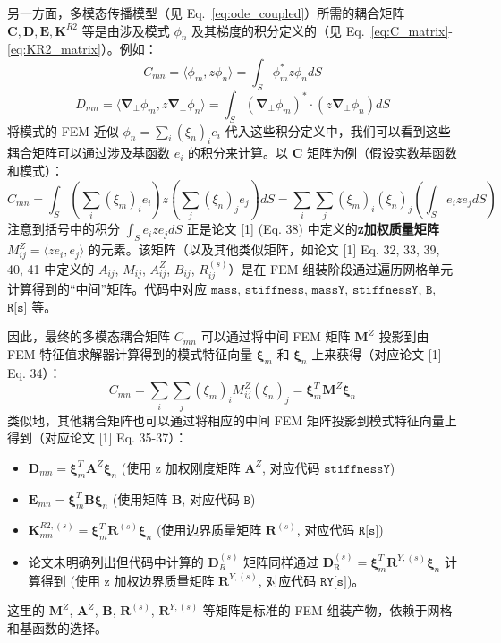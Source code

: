 \documentclass{ctexart}
\begin{document}
另一方面，多模态传播模型（见 Eq.~\eqref{eq:ode_coupled}）所需的耦合矩阵 $\mathbf{C}, \mathbf{D}, \mathbf{E}, \mathbf{K}^{R2}$ 等是由涉及模式 $\phi_n$ 及其梯度的积分定义的（见 Eq.~\eqref{eq:C_matrix}-\eqref{eq:KR2_matrix}）。例如：
\[
C_{mn} = \langle \phi_m, z \phi_n \rangle = \int_S \phi_m^* z \phi_n dS
\]
\[
D_{mn} = \langle \boldsymbol{\nabla}_\perp \phi_m, z \boldsymbol{\nabla}_\perp \phi_n \rangle = \int_S (\boldsymbol{\nabla}_\perp \phi_m)^* \cdot (z \boldsymbol{\nabla}_\perp \phi_n) dS
\]
将模式的 FEM 近似 $\phi_n = \sum_i (\xi_n)_i e_i$ 代入这些积分定义中，我们可以看到这些耦合矩阵可以通过涉及基函数 $e_i$ 的积分来计算。以 $\mathbf{C}$ 矩阵为例（假设实数基函数和模式）：
\[
C_{mn} = \int_S \left( \sum_i (\xi_m)_i e_i \right) z \left( \sum_j (\xi_n)_j e_j \right) dS = \sum_i \sum_j (\xi_m)_i (\xi_n)_j \left( \int_S e_i z e_j dS \right)
\]
注意到括号中的积分 $\int_S e_i z e_j dS$ 正是论文 [1] (Eq. 38) 中定义的\textbf{z加权质量矩阵} $M^Z_{ij} = \langle z e_i, e_j \rangle$ 的元素。该矩阵（以及其他类似矩阵，如论文 [1] Eq. 32, 33, 39, 40, 41 中定义的 $A_{ij}$, $M_{ij}$, $A^Z_{ij}$, $B_{ij}$, $R^{(s)}_{ij}$）是在 FEM 组装阶段通过遍历网格单元计算得到的``中间''矩阵。代码中对应 $\texttt{mass}$, $\texttt{stiffness}$, $\texttt{massY}$, $\texttt{stiffnessY}$, $\texttt{B}$, $\texttt{R[s]}$ 等。

因此，最终的多模态耦合矩阵 $C_{mn}$ 可以通过将中间 FEM 矩阵 $\mathbf{M}^Z$ 投影到由 FEM 特征值求解器计算得到的模式特征向量 $\boldsymbol{\xi}_m$ 和 $\boldsymbol{\xi}_n$ 上来获得（对应论文 [1] Eq. 34）：
\[
C_{mn} = \sum_i \sum_j (\xi_m)_i M^Z_{ij} (\xi_n)_j = \boldsymbol{\xi}_m^T \mathbf{M}^Z \boldsymbol{\xi}_n
\]
类似地，其他耦合矩阵也可以通过将相应的中间 FEM 矩阵投影到模式特征向量上得到（对应论文 [1] Eq. 35-37）：
\begin{itemize}
    \item $\mathbf{D}_{mn} = \boldsymbol{\xi}_m^T \mathbf{A}^Z \boldsymbol{\xi}_n$ (使用 z 加权刚度矩阵 $\mathbf{A}^Z$, 对应代码 $\texttt{stiffnessY}$)
    \item $\mathbf{E}_{mn} = \boldsymbol{\xi}_m^T \mathbf{B} \boldsymbol{\xi}_n$ (使用矩阵 $\mathbf{B}$, 对应代码 $\texttt{B}$)
    \item $\mathbf{K}^{R2, (s)}_{mn} = \boldsymbol{\xi}_m^T \mathbf{R}^{(s)} \boldsymbol{\xi}_n$ (使用边界质量矩阵 $\mathbf{R}^{(s)}$, 对应代码 $\texttt{R[s]}$)
    \item 论文未明确列出但代码中计算的 $\mathbf{D}_R^{(s)}$ 矩阵同样通过 $\mathbf{D}^{(s)}_{\mathrm{R}} = \boldsymbol{\xi}_m^T \mathbf{R}^{Y,(s)} \boldsymbol{\xi}_n$ 计算得到 (使用 z 加权边界质量矩阵 $\mathbf{R}^{Y,(s)}$, 对应代码 $\texttt{RY[s]}$)。
\end{itemize}
这里的 $\mathbf{M}^Z$, $\mathbf{A}^Z$, $\mathbf{B}$, $\mathbf{R}^{(s)}$, $\mathbf{R}^{Y,(s)}$ 等矩阵是标准的 FEM 组装产物，依赖于网格和基函数的选择。
\end{document}
